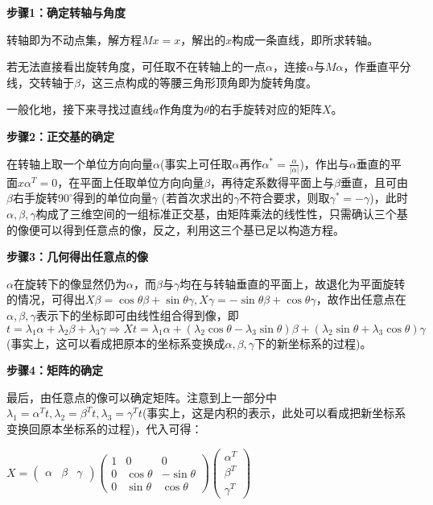 \documentclass[a4paper,UTF8,fontset=windows]{ctexart}
\begin{document}
\begin{enumerate}
\textbf{步骤1：确定转轴与角度}

转轴即为不动点集，解方程$Mx=x$，解出的$x$构成一条直线，即所求转轴。

若无法直接看出旋转角度，可任取不在转轴上的一点$\alpha$，连接$\alpha$与$M\alpha$，作垂直平分线，交转轴于$\beta$，这三点构成的等腰三角形顶角即为旋转角度。

一般化地，接下来寻找过直线$a$作角度为$\theta$的右手旋转对应的矩阵$X$。

\textbf{步骤2：正交基的确定}

在转轴上取一个单位方向向量$\alpha$(事实上可任取$\alpha$再作$\alpha^\ast=\frac{\alpha}{|\alpha|}$)，作出与$\alpha$垂直的平面$x\alpha^T=0$，在平面上任取单位方向向量$\beta$，再待定系数得平面上与$\beta$垂直，且可由$\beta$右手旋转$90^\circ$得到的单位向量$\gamma$ (若首次求出的$\gamma$不符合要求，则取$\gamma^\ast=-\gamma$)，此时$\alpha,\beta,\gamma$构成了三维空间的一组标准正交基，由矩阵乘法的线性性，只需确认三个基的像便可以得到任意点的像，反之，利用这三个基已足以构造方程。

\textbf{步骤3：几何得出任意点的像}

$\alpha$在旋转下的像显然仍为$\alpha$，而$\beta$与$\gamma$均在与转轴垂直的平面上，故退化为平面旋转的情况，可得出$X\beta=\cos{\theta}\beta+\sin{\theta}\gamma,X\gamma=-\sin{\theta}\beta+\cos{\theta}\gamma$，故作出任意点在$\alpha,\beta,\gamma$表示下的坐标即可由线性组合得到像，即$t=\lambda_1\alpha+\lambda_2\beta+\lambda_3\gamma\Rightarrow Xt=\lambda_1\alpha+(\lambda_2\cos{\theta}-\lambda_3\sin{\theta})\beta+(\lambda_2\sin{\theta}+\lambda_3\cos{\theta})\gamma$ (事实上，这可以看成把原本的坐标系变换成$\alpha,\beta,\gamma$下的新坐标系的过程)。

\textbf{步骤4：矩阵的确定}

最后，由任意点的像可以确定矩阵。注意到上一部分中$\lambda_1=\alpha^Tt,\lambda_2=\beta^Tt,\lambda_3=\gamma^Tt$(事实上，这是内积的表示，此处可以看成把新坐标系变换回原本坐标系的过程)，代入可得：

$X=\begin{pmatrix}\alpha&\beta&\gamma\end{pmatrix}\begin{pmatrix}1&0&0\\0&\cos{\theta}&-\sin{\theta}\\0&\sin{\theta}&\cos{\theta}\end{pmatrix}\begin{pmatrix}\alpha^T\\\beta^T\\\gamma^T\end{pmatrix}$


\end{enumerate}
\end{document}
